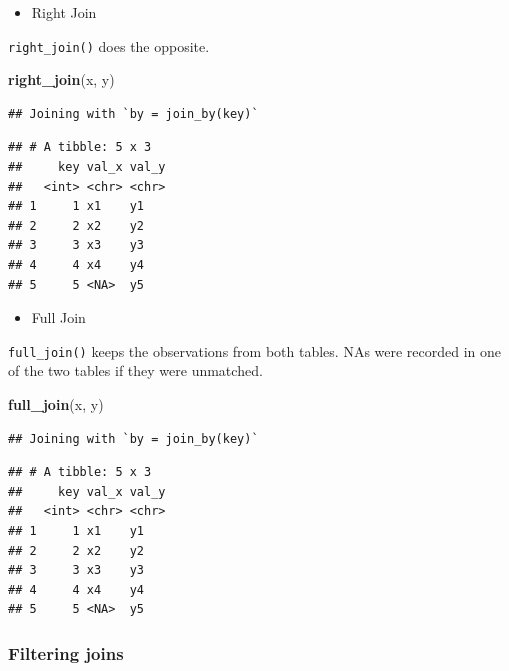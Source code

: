 \documentclass[
]{book}
\newenvironment{Shaded}{\begin{snugshade}}{\end{snugshade}}
\newcommand{\FunctionTok}[1]{\textcolor[rgb]{0.13,0.29,0.53}{\textbf{#1}}}
\newcommand{\NormalTok}[1]{#1}
\providecommand{\tightlist}{%
  \setlength{\itemsep}{0pt}\setlength{\parskip}{0pt}}
\begin{document}
\begin{itemize}
\tightlist
\item
  Right Join
\end{itemize}

\texttt{right\_join()} does the opposite.

\begin{Shaded}
\begin{Highlighting}[]
\FunctionTok{right\_join}\NormalTok{(x, y)}
\end{Highlighting}
\end{Shaded}

\begin{verbatim}
## Joining with `by = join_by(key)`
\end{verbatim}

\begin{verbatim}
## # A tibble: 5 x 3
##     key val_x val_y
##   <int> <chr> <chr>
## 1     1 x1    y1   
## 2     2 x2    y2   
## 3     3 x3    y3   
## 4     4 x4    y4   
## 5     5 <NA>  y5
\end{verbatim}

\begin{itemize}
\tightlist
\item
  Full Join
\end{itemize}

\texttt{full\_join()} keeps the observations from both tables. NAs were recorded in one of the two tables if they were unmatched.

\begin{Shaded}
\begin{Highlighting}[]
\FunctionTok{full\_join}\NormalTok{(x, y)}
\end{Highlighting}
\end{Shaded}

\begin{verbatim}
## Joining with `by = join_by(key)`
\end{verbatim}

\begin{verbatim}
## # A tibble: 5 x 3
##     key val_x val_y
##   <int> <chr> <chr>
## 1     1 x1    y1   
## 2     2 x2    y2   
## 3     3 x3    y3   
## 4     4 x4    y4   
## 5     5 <NA>  y5
\end{verbatim}

\subsubsection{Filtering joins}\label{filtering-joins}
\end{document}
